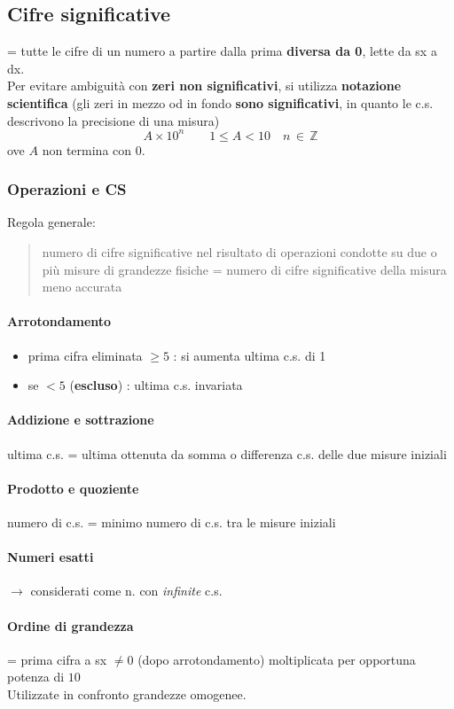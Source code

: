 \documentclass[10pt, oneside]{book}
\begin{document}
\subsection{Cifre significative}
= tutte le cifre di un numero a partire dalla prima \textbf{diversa da 0}, lette da sx a dx.\\
Per evitare ambiguità con \textbf{zeri non significativi}, si utilizza \textbf{notazione scientifica} (gli zeri in mezzo od in fondo \textbf{sono significativi}, in quanto le c.s. descrivono la precisione di una misura)
\[A \times 10^n \qquad 1 \leq A < 10 \quad n \, \in \, \mathbb{Z}\]
ove $A$ non termina con 0.

\subsubsection*{Operazioni e CS}
Regola generale:
\begin{quote}
numero di cifre significative nel risultato di operazioni condotte su due o più misure di grandezze fisiche = numero di cifre significative della misura meno accurata
\end{quote}
\paragraph{Arrotondamento}
\begin{itemize}
\item prima cifra eliminata $\geq 5$ : si aumenta ultima c.s. di 1
\item se $< 5$ (\textbf{escluso}) : ultima c.s. invariata
\end{itemize}
\paragraph{Addizione e sottrazione} ultima c.s. = ultima ottenuta da somma o differenza c.s. delle due misure iniziali
\paragraph{Prodotto e quoziente} numero di c.s. = minimo numero di c.s. tra le misure iniziali
\paragraph{Numeri esatti} $\rightarrow$ considerati come n. con \textit{infinite} c.s.
\paragraph{Ordine di grandezza} = prima cifra a sx $\neq 0$ (dopo arrotondamento) moltiplicata per opportuna potenza di $10$\\Utilizzate in confronto grandezze omogenee.
\end{document}
